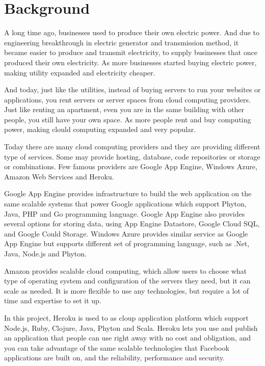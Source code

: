 
\section{Background}

A long time ago, businesses used to produce their own electric power. And due to engineering breakthrough in electric generator and transmission method, it became easier to produce and transmit electricity, to supply businesses that once produced their own electricity. As more businesses started buying electric power, making utility expanded and electricity cheaper. 

And today, just like the utilities, instead of buying servers to run your websites or applications, you rent servers or server spaces from cloud computing providers. Just like renting an apartment, even you are in the same building with other people, you still have your own space. As more people rent and buy computing power, making clould computing expanded and very popular. 

Today there are many cloud computing providers and they are providing different type of services. Some may provide hosting, database, code repositories or storage or combinations. Few famous providers are Google App Engine, Windows Azure, Amazon Web Services and Heroku. 

Google App Engine provides infrastructure to build the web application on the same scalable systems that power Google applications which support Phyton, Java, PHP and Go programming language. Google App Engine also provides several options for storing data, using App Engine Datastore, Google Cloud SQL, and Google Could Storage. Windows Azure provides similar service as Google App Engine but supports different set of programming language, such as .Net, Java, Node.js and Phyton.

Amazon provides scalable cloud computing, which allow users to choose what type of operating system and configuration of the servers they need, but it can scale as needed. It is more flexible to use any technologies, but require a lot of time and expertise to set it up. 

In this project, Heroku is used to as cloup application platform which support Node.js, Ruby, Clojure, Java, Phyton and Scala. Heroku lets you use and publish an application that people can use right away with no cost and obligation, and you can take advantage of the same scalable technologies that Facebook applications are built on, and the reliability, performance and security.


